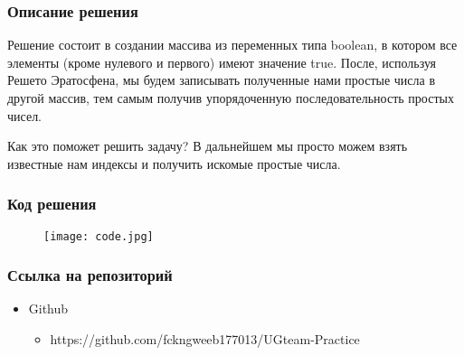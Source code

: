 \documentclass[10pt,pdf,hyperref={unicode}]{beamer}
\begin{document}
\begin{frame}
\frametitle{Описание решения}
Решение состоит в создании массива из переменных типа boolean, в котором все элементы (кроме нулевого и первого) имеют значение true. После, используя Решето Эратосфена, мы будем записывать полученные нами простые числа в другой массив, тем самым получив упорядоченную последовательность простых чисел.
\begin{block}{Как это поможет решить задачу?}
В дальнейшем мы просто можем взять известные нам индексы и получить искомые простые числа.
\end{block}
\end{frame}

\begin{frame}
\frametitle{Код решения}
\begin{figure}
\texttt{[image: code.jpg]}
\end{figure}
\end{frame}

\begin{frame}
\frametitle{Ссылка на репозиторий}
\begin{itemize}
\item Github
\begin{itemize}
\item https://github.com/fckngweeb177013/UGteam-Practice
\end{itemize}
\end{itemize}
\end{frame}
\end{document}
